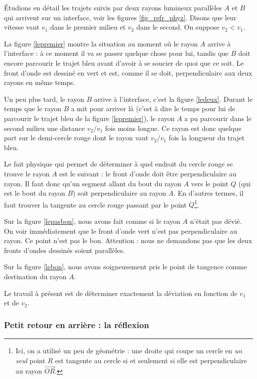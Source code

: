 Étudions en détail les trajets suivis par deux rayons lumineux parallèles $A$ et $B$ qui arrivent sur un interface, voir les figures \ref{fig_refr_phyz}. Disons que leur vitesse vaut $v_{1}$ dans le premier milieu et $v_{2}$ dans le second. On suppose $v_{2}<v_{1}$. 

La figure \ref{lepremier} montre la situation au moment où le rayon $A$ arrive à l'interface : à ce moment il va se passer quelque chose pour lui, tandis que $B$ doit encore parcourir le trajet bleu avant d'avoir à se soucier de quoi que ce soit. Le front d'onde est dessiné en vert et est, comme il se doit, perpendiculaire aux deux rayons en même temps.

Un peu plus tard, le rayon $B$ arrive à l'interface, c'est la figure \ref{ledeux}. Durant le temps que le rayon $B$ a mit pour arriver là (c'est à dire le temps pour lui de parcourir le trajet bleu de la figure \ref{lepremier}), le rayon $A$ a pu parcourir dans le second milieu une distance $v_{2}/v_{1}$ fois moins longue. Ce rayon est donc quelque part sur le demi-cercle rouge dont le rayon vaut $v_{2}/v_{1}$ fois la longueur du trajet bleu.

Le fait physique qui permet de déterminer à quel endroit du cercle rouge se trouve le rayon $A$ est le suivant : le front d'onde doit être perpendiculaire au rayon. Il faut donc qu'un segment allant du bout du rayon $A$ vers le point $Q$ (qui est le bout du rayon $B$) soit perpendiculaire au rayon $A$. En d'autres termes, il faut trouver la tangente au cercle rouge passant par le point $Q$\footnote{Ici, on a utilisé un peu de géométrie : une droite qui coupe un cercle en \emph{un seul} point $R$ est tangente au cercle si et seulement si elle est perpendiculaire au rayon $\overrightarrow{OR}$.}.

Sur la figure \ref{lepasbon}, nous avons fait comme si le rayon $A$ n'était pas dévié. On voir immédiatement que le front d'onde vert n'est pas perpendiculaire au rayon. Ce point n'est pas le bon. Attention : nous ne demandons pas que les deux fronts d'ondes dessinés soient parallèles.

Sur la figure \ref{lebon}, nous avons soigneusement pris le point de tangence comme destination du rayon $A$.


Le travail à présent est de déterminer exactement la déviation en fonction de $v_{1}$ et de $v_{2}$.

\subsubsection{Petit retour en arrière : la réflexion}

